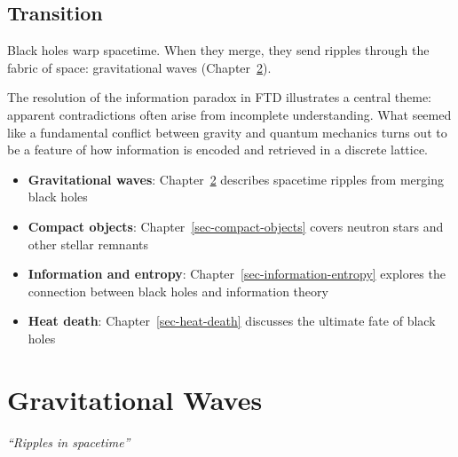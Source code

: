 \documentclass[
  11pt,
  letterpaper,
  twoside,
  openright]{book}
\providecommand{\tightlist}{%
  \setlength{\itemsep}{0pt}\setlength{\parskip}{0pt}}
\begin{document}
\section{Transition}\label{transition-33}

Black holes warp spacetime. When they merge, they send ripples through
the fabric of space: gravitational waves
(Chapter~\ref{sec-gravitational-waves}).

The resolution of the information paradox in FTD illustrates a central
theme: apparent contradictions often arise from incomplete
understanding. What seemed like a fundamental conflict between gravity
and quantum mechanics turns out to be a feature of how information is
encoded and retrieved in a discrete lattice.

\begin{tcolorbox}[enhanced jigsaw, leftrule=.75mm, title=\textcolor{quarto-callout-tip-color}{\faLightbulb}\hspace{0.5em}{Related Topics}, bottomrule=.15mm, opacityback=0, coltitle=black, arc=.35mm, colframe=quarto-callout-tip-color-frame, colbacktitle=quarto-callout-tip-color!10!white, colback=white, titlerule=0mm, breakable, bottomtitle=1mm, toptitle=1mm, rightrule=.15mm, toprule=.15mm, left=2mm, opacitybacktitle=0.6]

\begin{itemize}
\tightlist
\item
  \textbf{Gravitational waves}: Chapter~\ref{sec-gravitational-waves}
  describes spacetime ripples from merging black holes
\item
  \textbf{Compact objects}: Chapter~\ref{sec-compact-objects} covers
  neutron stars and other stellar remnants
\item
  \textbf{Information and entropy}:
  Chapter~\ref{sec-information-entropy} explores the connection between
  black holes and information theory
\item
  \textbf{Heat death}: Chapter~\ref{sec-heat-death} discusses the
  ultimate fate of black holes
\end{itemize}

\end{tcolorbox}

\chapter{Gravitational Waves}\label{sec-gravitational-waves}

\emph{``Ripples in spacetime''}
\end{document}
